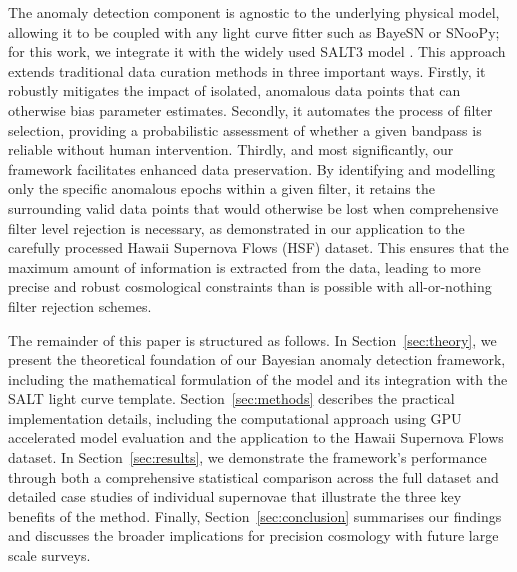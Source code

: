 The anomaly detection component is agnostic to the underlying physical model, allowing it to be coupled with any light curve fitter such as BayeSN or SNooPy; for this work, we integrate it with the widely used SALT3 model \citep{Guy2005orig, Guy2007, Kenworthy2021}. This approach extends traditional data curation methods in three important ways. Firstly, it robustly mitigates the impact of isolated, anomalous data points that can otherwise bias parameter estimates. Secondly, it automates the process of filter selection, providing a probabilistic assessment of whether a given bandpass is reliable without human intervention. Thirdly, and most significantly, our framework facilitates enhanced data preservation. By identifying and modelling only the specific anomalous epochs within a given filter, it retains the surrounding valid data points that would otherwise be lost when comprehensive filter level rejection is necessary, as demonstrated in our application to the carefully processed Hawaii Supernova Flows (HSF) \citep{do2025hawaii} dataset. This ensures that the maximum amount of information is extracted from the data, leading to more precise and robust cosmological constraints than is possible with all-or-nothing filter rejection schemes.

The remainder of this paper is structured as follows. In Section~\ref{sec:theory}, we present the theoretical foundation of our Bayesian anomaly detection framework, including the mathematical formulation of the model and its integration with the SALT light curve template. Section~\ref{sec:methods} describes the practical implementation details, including the computational approach using GPU accelerated model evaluation and the application to the Hawaii Supernova Flows dataset. In Section~\ref{sec:results}, we demonstrate the framework's performance through both a comprehensive statistical comparison across the full dataset and detailed case studies of individual supernovae that illustrate the three key benefits of the method. Finally, Section~\ref{sec:conclusion} summarises our findings and discusses the broader implications for precision cosmology with future large scale surveys.